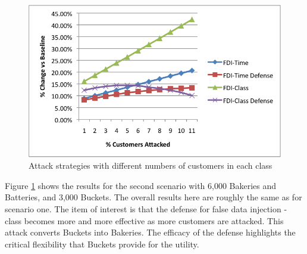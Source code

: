 \begin{figure}[!htbp]
\centering
\includegraphics[width=.5\textwidth]{unequal-attacks.png}
\caption{Attack strategies with different numbers of customers in each class}
\label{unequal-attack}
\end{figure}

Figure \ref{unequal-attack} shows the results for the second scenario with 6,000 Bakeries and Batteries, and 3,000 Buckets.  The overall results here are roughly the same as for scenario one.  The item of interest is that the defense for false data injection - class becomes more and more effective as more customers are attacked.  This attack converts Buckets into Bakeries.  The efficacy of the defense highlights the critical flexibility that Buckets provide for the utility.

